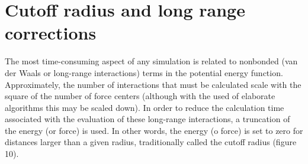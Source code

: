 \documentclass{scrbook}
\begin{document}
\section{Cutoff radius and long range corrections} 
The most time-consuming aspect of any simulation is related to nonbonded (van
der Waals or long-range interactions) terms in the potential energy function.
Approximately, the number of interactions that must be calculated scale with
the square of the number of force centers (although with the used of elaborate
algorithms this may be scaled down). In order to reduce the calculation time
associated with the evaluation of these long-range interactions, a truncation
of the energy (or force) is used. In other words, the energy (o force) is set
to zero for distances larger than a given radius, traditionally called the
cutoff radius (figure 10). 
\end{document}
